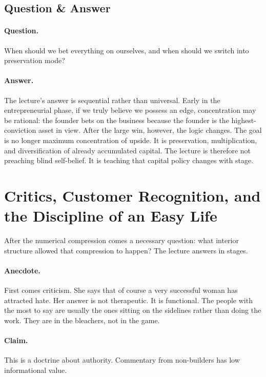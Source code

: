 \subsection{Question \& Answer}

\paragraph{Question.}
When should we bet everything on ourselves, and when should we switch into preservation mode?

\paragraph{Answer.}
The lecture's answer is sequential rather than universal. Early in the entrepreneurial phase, if we truly believe we possess an edge, concentration may be rational: the founder bets on the business because the founder is the highest-conviction asset in view. After the large win, however, the logic changes. The goal is no longer maximum concentration of upside. It is preservation, multiplication, and diversification of already accumulated capital. The lecture is therefore not preaching blind self-belief. It is teaching that capital policy changes with stage.

\section{Critics, Customer Recognition, and the Discipline of an Easy Life}

After the numerical compression comes a necessary question: what interior structure allowed that compression to happen? The lecture answers in stages.

\paragraph{Anecdote.}
First comes criticism. She says that of course a very successful woman has attracted hate. Her answer is not therapeutic. It is functional. The people with the most to say are usually the ones sitting on the sidelines rather than doing the work. They are in the bleachers, not in the game.

\paragraph{Claim.}
This is a doctrine about authority. Commentary from non-builders has low informational value.

